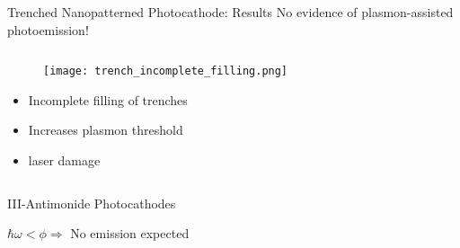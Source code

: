 \begin{frame}{Trenched Nanopatterned Photocathode: Results}
  \alert{No evidence of plasmon-assisted photoemission!}
  \begin{columns}
    \begin{column}{0.49\linewidth}
      \begin{figure}
        \centering
        \texttt{[image: trench\_incomplete\_filling.png]}
      \end{figure}
      \begin{itemize}
        \item Incomplete filling of trenches
        \item Increases plasmon threshold 
        \item[$\Rightarrow$] laser damage 
      \end{itemize}
    \end{column}
    \begin{column}{0.49\linewidth}
    \end{column}
  \end{columns}
\end{frame}

\begin{frame}{III-Antimonide Photocathodes}
  \begin{center}
    $\hbar \omega < \phi \Rightarrow $ No emission expected
  \end{center}
  \begin{columns}
    \begin{column}{0.68\linewidth}
    \end{column}
    \begin{column}{0.30\linewidth}
    \end{column}
  \end{columns}
\end{frame}

